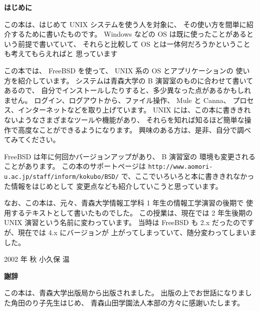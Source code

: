 \thispagestyle{empty}

\noindent
\begin{LARGE}
\textbf{はじめに}
\end{LARGE}

\bigskip
\bigskip

この本は、はじめて UNIX システムを使う人を対象に、
その使い方を間単に紹介するために書いたものです。
Windows などの OS は既に使ったことがあるという前提で書いていて、
それらと比較して OS とは一体何だろうかということも考えてもらえればと
思っています

\bigskip

この本では、 FreeBSD を使って、 UNIX 系の OS とアプリケーションの
使い方を紹介しています。
システムは青森大学の B 演習室のものに合わせて書いてあるので、
自分でインストールしたりすると、多少異なった点があるかもしれません。
ログイン、ログアウトから、ファイル操作、 Mule と Canna、
プロセス、インターネットなどを取り上げています。
UNIX には、この本に書ききれないようなさまざまなツールや機能があり、
それらを知れば知るほど簡単な操作で高度なことができるようになります。
興味のある方は、是非、自分で調べてみてください。

\bigskip

 FreeBSD は年に何回かバージョンアップがあり、 B 演習室の
環境も変更されることがあります。
この本のサポートページは
\texttt{http://www.aomori-u.ac.jp/staff/inform/kokubo/BSD/}
で、ここでいろいろと本に書ききれなかった情報をはじめとして
変更点なども紹介していこうと思っています。

\bigskip

なお、この本は、元々、青森大学情報工学科 1 年生の情報工学演習の後期で
使用するテキストとして書いたものでした。
この授業は、現在では 2 年生後期の UNIX 演習という名前に変わっています。
当時は FreeBSD も 2.x だったのですが、現在では 4.x にバージョンが
上がってしまっていて、随分変わってしまいました。

\begin{flushright}
2002 年 秋  小久保 温
\end{flushright}

\newpage

\thispagestyle{empty}

\noindent
\begin{LARGE}
\textbf{謝辞}
\end{LARGE}

\bigskip
\bigskip

この本は、青森大学出版局から出版されました。
出版の上でお世話になりました角田のり子先生はじめ、
青森山田学園法人本部の方々に感謝いたします。

